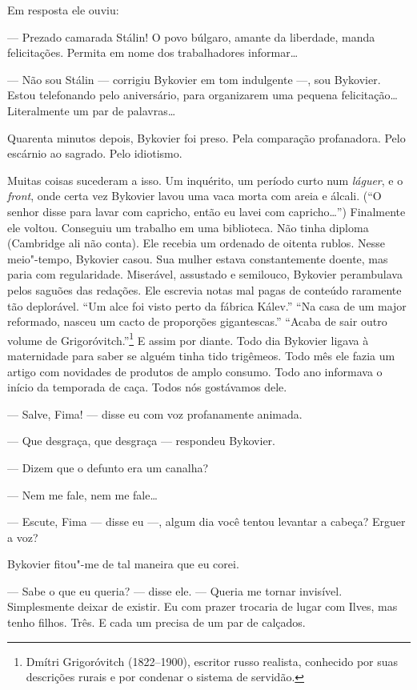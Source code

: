 Em resposta ele ouviu:

--- Prezado camarada Stálin! O povo búlgaro, amante da liberdade, manda
felicitações. Permita em nome dos trabalhadores informar\ldots{}

--- Não sou Stálin --- corrigiu Bykovier em tom indulgente ---, sou
Bykovier. Estou telefonando pelo aniversário, para organizarem uma
pequena felicitação\ldots{} Literalmente um par de palavras\ldots{}

Quarenta minutos depois, Bykovier foi preso. Pela comparação
profanadora. Pelo escárnio ao sagrado. Pelo idiotismo.

Muitas coisas sucederam a isso. Um inquérito, um período curto num
\emph{láguer}, e o \emph{front}, onde certa vez Bykovier lavou uma vaca
morta com areia e álcali. (``O senhor disse para lavar com capricho,
então eu lavei com capricho\ldots{}'') Finalmente ele voltou. Conseguiu um
trabalho em uma biblioteca. Não tinha diploma (Cambridge ali não conta).
Ele recebia um ordenado de oitenta rublos. Nesse meio"-tempo, Bykovier
casou. Sua mulher estava constantemente doente, mas paria com
regularidade. Miserável, assustado e semilouco, Bykovier perambulava
pelos saguões das redações. Ele escrevia notas mal pagas de conteúdo
raramente tão deplorável. ``Um alce foi visto perto da fábrica Kálev.''
``Na casa de um major reformado, nasceu um cacto de proporções
gigantescas.'' ``Acaba de sair outro volume de Grigoróvitch.''\footnote{Dmítri
  Grigoróvitch (1822--1900), escritor russo realista, conhecido por suas
  descrições rurais e por condenar o sistema de servidão.} E assim por
diante. Todo dia Bykovier ligava à maternidade para saber se alguém
tinha tido trigêmeos. Todo mês ele fazia um artigo com novidades de
produtos de amplo consumo. Todo ano informava o início da temporada de
caça. Todos nós gostávamos dele.

--- Salve, Fima! --- disse eu com voz profanamente animada.

--- Que desgraça, que desgraça --- respondeu Bykovier.

--- Dizem que o defunto era um canalha?

--- Nem me fale, nem me fale\ldots{}

--- Escute, Fima --- disse eu ---, algum dia você tentou levantar a
cabeça? Erguer a voz?

Bykovier fitou"-me de tal maneira que eu corei.

--- Sabe o que eu queria? --- disse ele. --- Queria me tornar invisível.
Simplesmente deixar de existir. Eu com prazer trocaria de lugar com
Ilves, mas tenho filhos. Três. E cada um precisa de um par de calçados.

